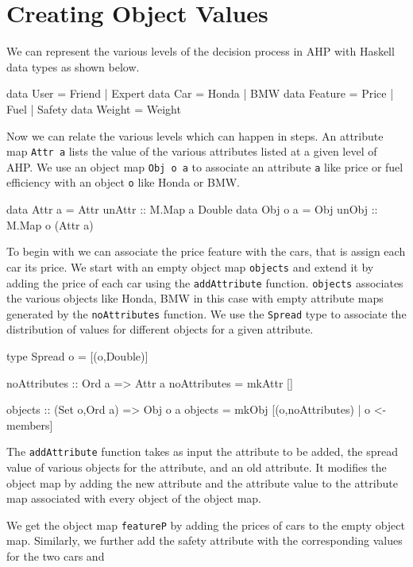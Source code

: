 \documentclass{jfp}
\newcommand{\prog}[1]{\texttt{#1}}
\begin{document}
\section{Creating Object Values}
We can represent the various levels of the decision process in AHP with Haskell data types as shown below.

\begin{haskellcode}
data User    = Friend | Expert 
data Car     = Honda | BMW  
data Feature = Price | Fuel | Safety 
data Weight  = Weight 
\end{haskellcode}

Now we can relate the various levels which can happen in steps. An attribute map \prog{Attr a} lists the value of the various attributes listed at a given level of AHP. We use an object map \prog{Obj o a} to associate an attribute \prog{a} like price or fuel efficiency with an object \prog{o} like Honda or BMW. 
\begin{haskellcode}
data Attr a = Attr {unAttr :: M.Map a Double}
data Obj o a = Obj {unObj :: M.Map o (Attr a)}
\end{haskellcode}

To begin with we can associate the price feature with the cars, that is assign each car its price. We start with an empty object map \prog{objects} and extend it by adding the price of each car using the \prog{addAttribute} function. \prog{objects} associates the various objects like Honda, BMW in this case with empty attribute maps generated by the \prog{noAttributes} function. We use the \prog{Spread} type to associate the distribution of values for different objects for a given attribute. 
\begin{haskellcode}
type Spread o = [(o,Double)]

noAttributes :: Ord a => Attr a
noAttributes = mkAttr []

objects :: (Set o,Ord a) => Obj o a
objects = mkObj [(o,noAttributes) | o <- members]
\end{haskellcode}

The \prog{addAttribute} function takes as input the attribute to be added, the spread value of various objects for the attribute, and an old attribute. It modifies the object map by adding the new attribute and the attribute value to the attribute map associated with every object of the object map.
We get the object map \prog{featureP} by adding the prices of cars to the empty object map. Similarly, we further add the safety attribute with the corresponding values for the two cars and 
\end{document}
